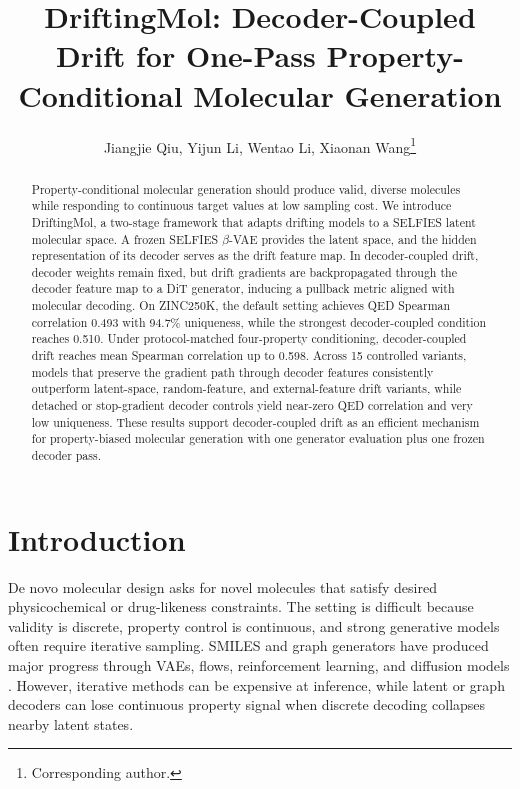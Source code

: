 \documentclass[letterpaper]{article}
\title{DriftingMol: Decoder-Coupled Drift for One-Pass Property-Conditional Molecular Generation}
\author{Jiangjie Qiu, Yijun Li, Wentao Li, Xiaonan Wang\thanks{Corresponding author.}}
\begin{document}
\maketitle

\begin{abstract}
Property-conditional molecular generation should produce valid, diverse
molecules while responding to continuous target values at low sampling cost.
We introduce DriftingMol, a two-stage framework that adapts drifting models to
a SELFIES latent molecular space. A frozen SELFIES $\beta$-VAE provides the
latent space, and the hidden representation of its decoder serves as the drift
feature map. In decoder-coupled drift, decoder weights remain fixed, but drift
gradients are backpropagated through the decoder feature map to a DiT generator,
inducing a pullback metric aligned with molecular decoding. On ZINC250K, the
default setting achieves QED Spearman correlation 0.493 with 94.7\% uniqueness,
while the strongest decoder-coupled condition reaches 0.510. Under
protocol-matched
four-property conditioning, decoder-coupled drift reaches mean Spearman
correlation up to 0.598. Across 15 controlled variants, models that preserve
the gradient path through decoder features consistently outperform
latent-space, random-feature, and external-feature drift variants, while
detached or stop-gradient decoder controls yield near-zero QED correlation and
very low uniqueness. These results support decoder-coupled drift as an
efficient mechanism for property-biased molecular generation with one generator
evaluation plus one frozen decoder pass.
\end{abstract}

\section{Introduction}

De novo molecular design asks for novel molecules that satisfy desired
physicochemical or drug-likeness constraints. The setting is difficult because
validity is discrete, property control is continuous, and strong generative
models often require iterative sampling. SMILES and graph generators have
produced major progress through VAEs, flows, reinforcement learning, and
diffusion models \cite{gomez2018automatic,jtvae,moflow,digress,gdss,
olivecrona2017molecular}. However, iterative methods can be expensive at
inference, while latent or graph decoders can lose continuous property signal
when discrete decoding collapses nearby latent states.
\end{document}
